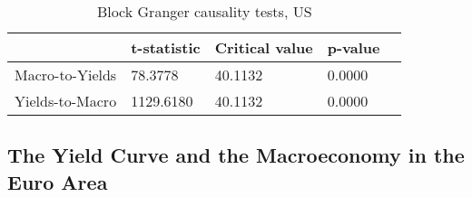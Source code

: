 \begin{table}[!t]
    \centering
    \begin{tabular}{lllll}
    \toprule
    {} &     t-statistic &      Critical value &                 p-value 
    \\
    \midrule
    Macro-to-Yields &  78.3778 &  40.1132 &  0.0000 &   \\
    Yields-to-Macro & 1129.6180 &  40.1132 &  0.0000 &  \\
\bottomrule
    \end{tabular}
    \caption{Block Granger causality tests, US}
    \label{tab:granger_us}
\end{table}



\subsection{The Yield Curve and the Macroeconomy in the Euro Area}
\label{sec:analysis_ea}

